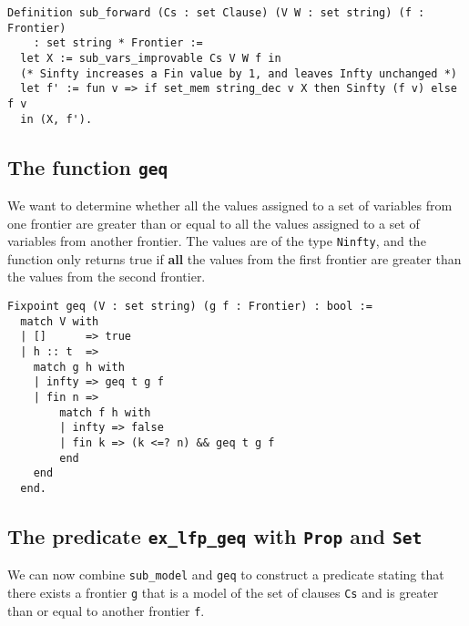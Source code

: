 \begin{minipage}{\linewidth}
\begin{lstlisting}[language=Coq, label={lst:sub_forward_def}, caption={The function \lstinline{sub_forward}}]
Definition sub_forward (Cs : set Clause) (V W : set string) (f : Frontier)
    : set string * Frontier :=
  let X := sub_vars_improvable Cs V W f in
  (* Sinfty increases a Fin value by 1, and leaves Infty unchanged *)
  let f' := fun v => if set_mem string_dec v X then Sinfty (f v) else f v
  in (X, f').
\end{lstlisting}
\end{minipage}

\subsection{The function \lstinline{geq}}

We want to determine whether all the values assigned to a set of variables
from one frontier are greater than or equal to all the values assigned to a set of variables
from another frontier. The values are of the type \lstinline{Ninfty}, and the function
only returns true if \textbf{all} the values from the first frontier are greater than
the values from the second frontier.

\begin{minipage}{\linewidth}
\begin{lstlisting}[language=Coq, label={lst:geq_def}, caption={Point-wise comparing frontiers with \lstinline{geq} in Coq}]
Fixpoint geq (V : set string) (g f : Frontier) : bool :=
  match V with
  | []      => true
  | h :: t  =>
    match g h with
    | infty => geq t g f
    | fin n =>
        match f h with
        | infty => false
        | fin k => (k <=? n) && geq t g f
        end
    end
  end.
\end{lstlisting}
\end{minipage}

\subsection{The predicate \lstinline{ex_lfp_geq} with \lstinline{Prop} and \lstinline{Set}}
\label{ssec:ex_lfp_geq}

We can now combine \lstinline{sub_model} and \lstinline{geq} to construct a predicate
stating that there exists a frontier \lstinline{g} that is a model of the set of clauses \lstinline{Cs}
and is greater than or equal to another frontier \lstinline{f}.

